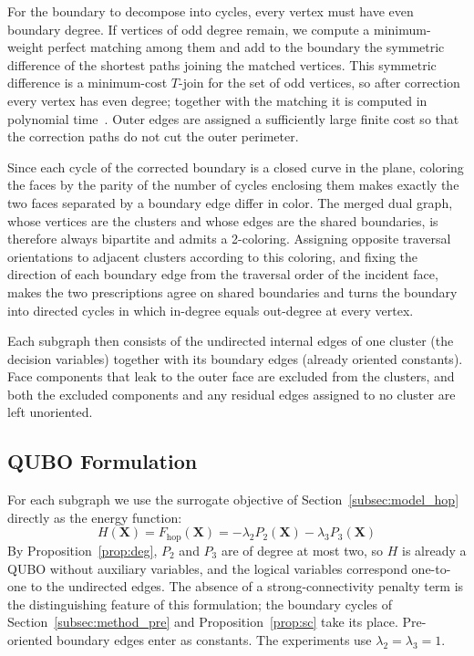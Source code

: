 \documentclass[twocolumn,a4paper]{article}
\begin{document}
For the boundary to decompose into cycles, every vertex must have even boundary degree. If vertices of odd degree remain, we compute a minimum-weight perfect matching among them and add to the boundary the symmetric difference of the shortest paths joining the matched vertices. This symmetric difference is a minimum-cost \(T\)-join for the set of odd vertices, so after correction every vertex has even degree; together with the matching it is computed in polynomial time~\cite{edmonds1973matching}. Outer edges are assigned a sufficiently large finite cost so that the correction paths do not cut the outer perimeter.

Since each cycle of the corrected boundary is a closed curve in the plane, coloring the faces by the parity of the number of cycles enclosing them makes exactly the two faces separated by a boundary edge differ in color. The merged dual graph, whose vertices are the clusters and whose edges are the shared boundaries, is therefore always bipartite and admits a 2-coloring. Assigning opposite traversal orientations to adjacent clusters according to this coloring, and fixing the direction of each boundary edge from the traversal order of the incident face, makes the two prescriptions agree on shared boundaries and turns the boundary into directed cycles in which in-degree equals out-degree at every vertex.

Each subgraph then consists of the undirected internal edges of one cluster (the decision variables) together with its boundary edges (already oriented constants). Face components that leak to the outer face are excluded from the clusters, and both the excluded components and any residual edges assigned to no cluster are left unoriented.

\subsection{QUBO Formulation} \label{subsec:method_qubo}

For each subgraph we use the surrogate objective of Section~\ref{subsec:model_hop} directly as the energy function:
\begin{equation}
    H(\mathbf{X})=F_{\mathrm{hop}}(\mathbf{X})=-\lambda_2P_2(\mathbf{X})-\lambda_3P_3(\mathbf{X})
\label{eq:hamiltonian}
\end{equation}
By Proposition~\ref{prop:deg}, \(P_2\) and \(P_3\) are of degree at most two, so \(H\) is already a QUBO without auxiliary variables, and the logical variables correspond one-to-one to the undirected edges. The absence of a strong-connectivity penalty term is the distinguishing feature of this formulation; the boundary cycles of Section~\ref{subsec:method_pre} and Proposition~\ref{prop:sc} take its place. Pre-oriented boundary edges enter as constants. The experiments use \(\lambda_2=\lambda_3=1\).
\end{document}
